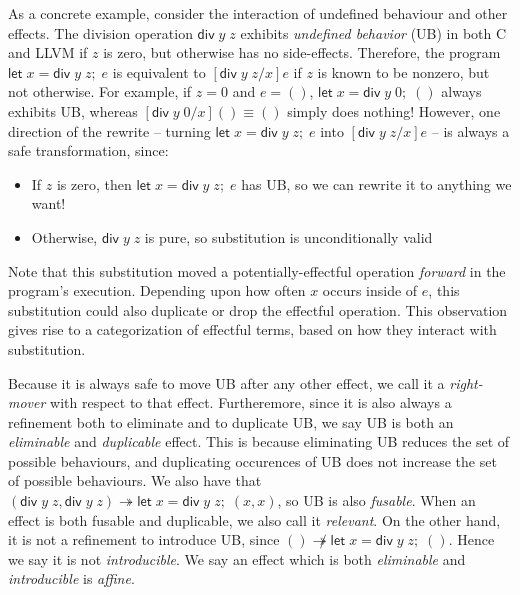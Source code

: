 \documentclass[acmsmall,screen,anonymous,review]{acmart}
\newcommand{\ms}[1]{\ensuremath{\mathsf{#1}}}
\newcommand{\letexpr}[3]{\ensuremath{\ms{let}\;#1 = #2;\;#3}}
\newcommand{\tref}{\twoheadrightarrow}
\begin{document}
As a concrete example, consider the interaction of undefined behaviour and other effects.
The division operation $\ms{div}\;y\;z$ exhibits \emph{undefined behavior} (UB) in both C and
LLVM if $z$ is zero, but otherwise has no side-effects. Therefore, the program 
$\letexpr{x}{\ms{div}\;y\;z}{e}$ is equivalent to $[\ms{div}\;y\;z/x]e$ if $z$ is known
to be nonzero, but not otherwise. For example, if $z = 0$ and $e = ()$,
$\letexpr{x}{\ms{div}\;y\;0}{()}$ always exhibits UB, whereas $[\ms{div}\;y\;0/x]() \equiv ()$ simply
does nothing! However, one direction of the rewrite -- turning $\letexpr{x}{\ms{div}\;y\;z}{e}$ into
$[\ms{div}\;y\;z/x]e$ -- is always a safe transformation, since:
\begin{itemize}
  \item If $z$ is zero, then $\letexpr{x}{\ms{div}\;y\;z}{e}$ has UB, so we can rewrite it to
  anything we want!
  \item Otherwise, $\ms{div}\;y\;z$ is pure, so substitution is unconditionally valid
\end{itemize}
%
% 
% 
Note that this substitution moved a potentially-effectful operation \emph{forward} in the program's
execution. Depending upon how often $x$ occurs inside of $e$, this substitution could also duplicate
or drop the effectful operation. This observation gives rise to a categorization of effectful terms,
based on how they interact with substitution. 

Because it is always safe to move UB after any other effect, we call it a \emph{right-mover} with
respect to that effect. Furtheremore, since it is also always a refinement both to eliminate and to
duplicate UB, we say UB is both an \emph{eliminable} and \emph{duplicable} effect. This is because
eliminating UB reduces the set of possible behaviours, and duplicating occurences of UB does not
increase the set of possible behaviours. We also have that $(\ms{div}\;y\;z, \ms{div}\;y\;z) \tref
\letexpr{x}{\ms{div}\;y\;z}{(x, x)}$, so UB is also \emph{fusable}. When an effect is both fusable
and duplicable, we also call it \emph{relevant}.  On the other hand, it is not a refinement to
introduce UB, since $() \not\tref \letexpr{x}{\ms{div}\;y\;z}{()}$. Hence we say it is not
\emph{introducible}. We say an effect which is both \emph{eliminable} and \emph{introducible} is
\emph{affine}. 
\end{document}
